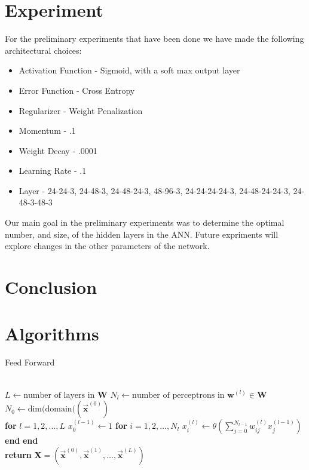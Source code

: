 \documentclass[prl,amsmath,amssymb,floatfix,superscriptaddress,notitlepage,twocolumn]{revtex4}
\newcommand{\vc}[1]{\vec{\mathbf{#1}}} 								%
\begin{document}
\section{Experiment}



For the preliminary experiments that have been done we have made the following architectural choices:
\begin{itemize}
\item Activation Function - Sigmoid, with a soft max output layer
\item Error Function - Cross Entropy
\item Regularizer - Weight Penalization
\item Momentum - .1
\item Weight Decay - .0001
\item Learning Rate - .1
\item Layer - {24-24-3, 24-48-3, 24-48-24-3, 48-96-3, 24-24-24-24-3, 24-48-24-24-3, 24-48-3-48-3 } 
\end{itemize}
Our main goal in the preliminary experiments was to determine the optimal number, and size, of the hidden layers in the ANN. Future expriments will explore changes in the other parameters of the network. 
\section{Conclusion}


\section{Algorithms}

\begin{algorithm}[H]
\caption{Feed Forward}\label{feed_forward}
\begin{algorithmic}[]
\Procedure{FeedForward}{$\vc x^{(0)}$,\textbf{W}}\\
\State $L \gets \text{number of layers in }\textbf{W}$
\State $N_l \gets \text{number of perceptrons in } \textbf{w}^{(l)}\in\textbf{W}$
\State $N_0 \gets \text{dim(domain(}(\vc x^{(0)})$\\

\State \textbf{for} $l=1,2,\dots,L$
\State \hspace{.25cm}$x^{(l-1)}_0 \gets 1$
\State \hspace{.25cm}\textbf{for} $i=1,2,\dots,N_l$
\State \hspace{.25cm}\hspace{.25cm}$x^{(l)}_i\gets\theta(\sum_{j=0}^{N_{l-1}}w^{(l)}_{ij}x^{(l-1)}_j)$
\State \hspace{.25cm}\textbf{end}
\State \textbf{end}\\

\State \textbf{return} \textbf{X}$=(\vc x^{(0)},\vc x^{(1)},\dots,\vc x^{(L)})$\\
\EndProcedure
\end{algorithmic}
\end{algorithm}
\end{document}
